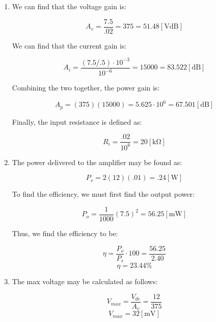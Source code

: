 \begin{enumerate}
    \begin{enumerate}

      \item

        \begin{center}
          We can find that the voltage gain is:
        \end{center}
        $$\boxed{A_{v}=\frac{7.5}{.02}=375=51.48[\si{\volt}\text{dB}]}$$

        \begin{center}
          We can find that the current gain is:
        \end{center}
        $$\boxed{A_{i}=\frac{(7.5/.5)\cdot10^{-3}}{10^{-6}}=15000=83.522[\text{dB}]}$$

        \begin{center}
          Combining the two together, the power gain is:
        \end{center}
        $$\boxed{A_{p}=(375)(15000)=5.625\cdot10^6=67.501[\text{dB}]}$$

        \begin{center}
          Finally, the input resistance is defined as:
        \end{center}
        $$\boxed{R_{i}=\frac{.02}{10^6}=20[\si{\kilo\ohm}]}$$

      \item 

        \begin{center}
          The power delivered to the amplifier may be found as:
        \end{center}
        $$\boxed{P_s=2(12)(.01)=.24[\si{\watt}]}$$

        \begin{center}
          To find the efficiency, we must first find the output power:
        \end{center}
        $$P_o=\frac{1}{1000}(7.5)^2=56.25[\si{\milli\watt}]$$

        \begin{center}
          Thus, we find the efficiency to be:
        \end{center}
        $$\eta=\frac{P_o}{P_s}\cdot100=\frac{56.25}{2.40}$$
        $$\boxed{\eta=23.44\%}$$

      \item 

        \begin{center}
          The max voltage may be calculated as follows:
        \end{center}
        $$V_{max}=\frac{V_{dc}}{A_v}=\frac{12}{375}$$
        $$\boxed{V_{max}=32[\si{\milli\volt}]}$$


\end{enumerate}
\end{enumerate}
